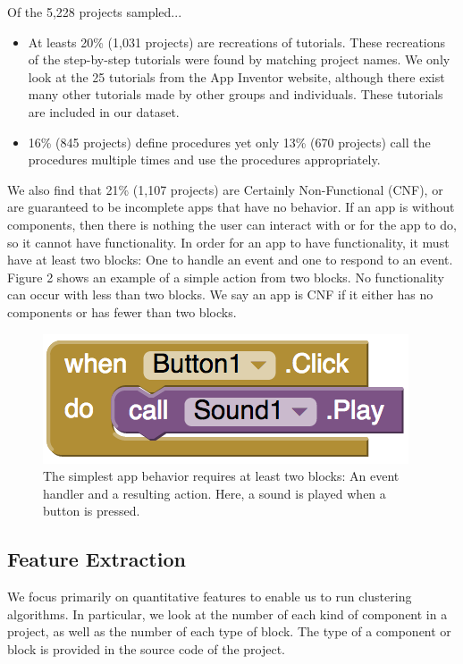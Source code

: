 \documentclass[conference]{IEEEtran}
\begin{document}
Of the 5,228 projects sampled...
\begin{itemize}
	\item At leasts 20\% (1,031 projects) are recreations of tutorials. These recreations of the step-by-step tutorials were found by matching project names. We only look at the 25 tutorials from the App Inventor website, although there exist many other tutorials made by other groups and individuals.\cite{ai_tutorials} These tutorials are included in our dataset.
	\item 16\% (845 projects) define procedures yet only 13\% (670 projects) call the procedures multiple times and use the procedures appropriately.	
\end{itemize}

We also find that 21\% (1,107 projects) are Certainly Non-Functional (CNF), or are guaranteed to be incomplete apps that have no behavior. If an app is without components, then there is nothing the user can interact with or for the app to do, so it cannot have functionality. In order for an app to have functionality, it must have at least two blocks: One to handle an event and one to respond to an event. Figure 2 shows an example of a simple action from two blocks. No functionality can occur with less than two blocks. We say an app is CNF if it either has no components or has fewer than two blocks.

\begin{figure}[h!]
	\centering
	\includegraphics[width=0.55\linewidth]{simple_blocks.png}
	\caption{The simplest app behavior requires at least two blocks: An event handler and a resulting action. Here, a sound is played when a button is pressed.}
	\label{FIgure 2: Most Basic Block Example}
\end{figure}

\subsection{Feature Extraction}
We focus primarily on quantitative features to enable us to run clustering algorithms. In particular, we look at the number of each kind of component in a project, as well as the number of each type of block. The type of a component or block is provided in the source code of the project. 
\end{document}

